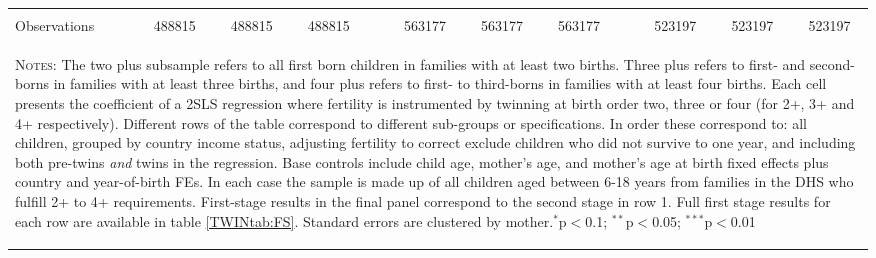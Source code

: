 \begin{landscape}
\begin{table}[htpb!]
\begin{center}
\begin{tabular}{lcccp{2mm}cccp{2mm}ccc}
\begin{footnotesize}\end{footnotesize}&\begin{footnotesize}\end{footnotesize}&\begin{footnotesize}\end{footnotesize}&\begin{footnotesize}\end{footnotesize}&\begin{footnotesize}\end{footnotesize}&\begin{footnotesize}\end{footnotesize}&\begin{footnotesize}\end{footnotesize}&\begin{footnotesize}\end{footnotesize}&\begin{footnotesize}\end{footnotesize}&\begin{footnotesize}\end{footnotesize}\\Observations&488815&488815&488815&&563177&563177&563177&&523197&523197&523197\\

\midrule\multicolumn{12}{p{19.2cm}}{\begin{footnotesize}\textsc{Notes:} The two plus subsample refers to all first born children in families with at least two births.  Three plus refers to first- and second-borns in families with at least three births, and four plus refers to first- to third-borns in families with at least four births.  Each cell presents the coefficient of a 2SLS regression where fertility is instrumented by twinning at birth order two, three or four (for 2+, 3+ and 4+ respectively).  Different rows of the table correspond to different sub-groups or specifications. In order these correspond to: all children, grouped by country income status, adjusting fertility to correct exclude children who did not survive to one year, and including both pre-twins \emph{and} twins in the regression. Base controls include child age, mother's age, and mother's age at birth fixed effects plus country and year-of-birth FEs.  In each case the sample is made up of all children aged between 6-18 years from families in the DHS who fulfill 2+ to 4+ requirements. First-stage results in the final panel correspond to the second stage in row 1. Full first stage results for each row are available in table \ref{TWINtab:FS}. Standard errors are clustered by mother.$^{*}$p$<$0.1; $^{**}$p$<$0.05; $^{***}$p$<$0.01 
\end{footnotesize}} \\ \bottomrule 
\end{tabular}\end{center}\end{table}\end{landscape}